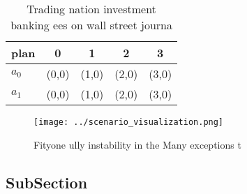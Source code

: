 \documentclass[a4paper]{article}
\begin{document}
\begin{table}
\begin{adjustbox}{width=0.5\columnwidth}
\begin{tabular}{|l|l|l|l|l|}
\hline
\textbf{plan} & \multicolumn{1}{c|}{\textbf{0}} & \multicolumn{1}{c|}{\textbf{1}} & \multicolumn{1}{c|}{\textbf{2}} & \multicolumn{1}{c|}{\textbf{3}} \\ \hline
\textbf{$a_0$}  & (0,0) & (1,0) & (2,0) & (3,0) \\ \hline
\textbf{$a_1$}  & (0,0) & (1,0) & (2,0) & (3,0) \\ \hline
\end{tabular}
\end{adjustbox}
\caption{Trading nation investment banking ees on wall street journa
}
\end{table}

\begin{figure}
\centering
\texttt{[image: ../scenario\_visualization.png]}
\caption{Fityone ully instability in the Many exceptions t
}
\end{figure}
 
\subsection{SubSection}
\end{document}
